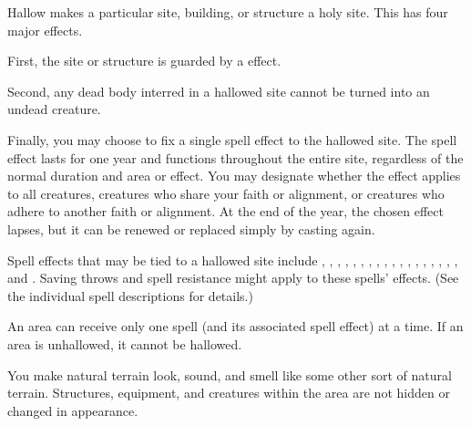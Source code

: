\spellrng{\rngclose}
\begin{spelleffect}
Hallow makes a particular site, building, or structure a holy site. This has four major effects.
\par First, the site or structure is guarded by a  effect.
\par Second, any dead body interred in a hallowed site cannot be turned into an undead creature.
\par Finally, you may choose to fix a single spell effect to the hallowed site. The spell effect lasts for one year and functions throughout the entire site, regardless of the normal duration and area or effect. You may designate whether the effect applies to all creatures, creatures who share your faith or alignment, or creatures who adhere to another faith or alignment. At the end of the year, the chosen effect lapses, but it can be renewed or replaced simply by casting  again.
\par Spell effects that may be tied to a hallowed site include , , , , , , , , , , , , , , , , , , and . Saving throws and spell resistance might apply to these spells' effects. (See the individual spell descriptions for details.)
\end{spelleffect}
\begin{spellnotes}
\par An area can receive only one  spell (and its associated spell effect) at a time. If an area is unhallowed, it cannot be hallowed.
\end{spellnotes}

\spellrng{\rnglong}
\begin{spelleffect}
You make natural terrain look, sound, and smell like some other sort of natural terrain. Structures, equipment, and creatures within the area are not hidden or changed in appearance.
\end{spelleffect}

